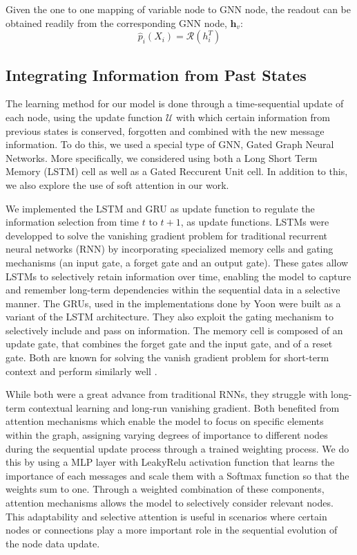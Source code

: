 \documentclass{article}
\begin{document}
Given the one to one mapping of variable node to GNN node, the readout can be obtained readily from the corresponding GNN node, $\textbf{h}_v$:
\begin{equation}
    \hat{p}_i(X_i) = \mathcal{R}(h^{T}_i)
\end{equation}
\subsection{Integrating Information from Past States}
The learning method for our model is done through a time-sequential update of each node, using the update function $\mathcal{U}$ with which certain information from previous states is conserved, forgotten and combined with the new message information. To do this, we used a special type of GNN, Gated Graph Neural Networks. More specifically, we considered using both a Long Short Term Memory (LSTM) cell as well as a Gated Reccurent Unit cell. In addition to this, we also explore the use of soft attention in our work. 

We implemented the LSTM and GRU as update function to regulate the information selection from time $t$ to $t+1$, as update functions. LSTMs were developped to solve the vanishing gradient problem for traditional recurrent neural networks (RNN) by incorporating specialized memory cells and gating mechanisms (an input gate, a forget gate and an output gate). These gates allow LSTMs to selectively retain information over time, enabling the model to capture and remember long-term dependencies within the sequential data in a selective manner. The GRUs, used in the implementations done by Yoon \cite{inf_pgm_gnn} were built as a variant of the LSTM architecture. They also exploit the gating mechanism to selectively include and pass on information. The memory cell is composed of an update gate, that combines the forget gate and the input gate, and of a reset gate. Both are known for solving the vanish gradient problem for short-term context and perform similarly well \cite{gruvslstm}. 

While both were a great advance from traditional RNNs, they struggle with long-term contextual learning and long-run vanishing gradient. Both benefited from attention mechanisms which enable the model to focus on specific elements within the graph, assigning varying degrees of importance to different nodes during the sequential update process through a trained weighting process. We do this by using a MLP layer with LeakyRelu activation function that learns the importance of each messages and scale them with a Softmax function so that the weights sum to one. Through a weighted combination of these components, attention mechanisms allows the model to selectively consider relevant nodes. This adaptability and selective attention is useful in scenarios where certain nodes or connections play a more important role in the sequential evolution of the node data update.
\end{document}
